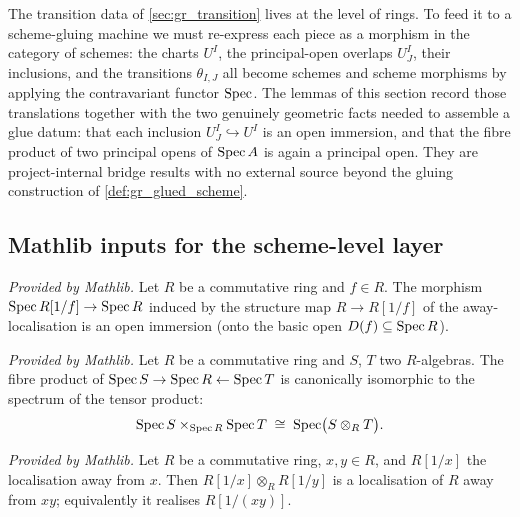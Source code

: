 The transition data of \cref{sec:gr_transition} lives at the level of rings. To
feed it to a scheme-gluing machine we must re-express each piece as a morphism in
the category of schemes: the charts \(U^I\), the principal-open overlaps
\(U^I_J\), their inclusions, and the transitions \(\theta_{I,J}\) all become
schemes and scheme morphisms by applying the contravariant functor \(\operatorname{Spec}\).
The lemmas of this section record those translations together with the two
genuinely geometric facts needed to assemble a glue datum: that each inclusion
\(U^I_J \hookrightarrow U^I\) is an open immersion, and that the fibre product of
two principal opens of \(\operatorname{Spec} A\) is again a principal open. They are
project-internal bridge results with no external source beyond the gluing
construction of \cref{def:gr_glued_scheme}.

\subsection*{Mathlib inputs for the scheme-level layer}

\begin{lemma}
  \label{lem:mathlib_specMap_localizationAway_isOpenImmersion}
  \mathlibok
  \textit{Provided by Mathlib.}
  Let \(R\) be a commutative ring and \(f \in R\). The morphism
  \(\operatorname{Spec} R[1/f] \to \operatorname{Spec} R\) induced by the structure map \(R \to R[1/f]\) of
  the away-localisation is an open immersion (onto the basic open
  \(D(f) \subseteq \operatorname{Spec} R\)).
\end{lemma}

\begin{lemma}
  \label{lem:mathlib_pullbackSpecIso}
  \mathlibok
  \textit{Provided by Mathlib.}
  Let \(R\) be a commutative ring and \(S\), \(T\) two \(R\)-algebras. The fibre
  product of \(\operatorname{Spec} S \to \operatorname{Spec} R \leftarrow \operatorname{Spec} T\) is canonically isomorphic
  to the spectrum of the tensor product:
  \[
    \operatorname{Spec} S \times_{\operatorname{Spec} R} \operatorname{Spec} T \;\cong\; \operatorname{Spec}\bigl(S \otimes_R T\bigr).
  \]
\end{lemma}

\begin{lemma}
  \label{lem:mathlib_isLocalization_away_mul}
  \mathlibok
  \textit{Provided by Mathlib.}
  Let \(R\) be a commutative ring, \(x, y \in R\), and \(R[1/x]\) the localisation
  away from \(x\). Then \(R[1/x] \otimes_R R[1/y]\) is a localisation of \(R\)
  away from \(x y\); equivalently it realises \(R[1/(xy)]\).
\end{lemma}

